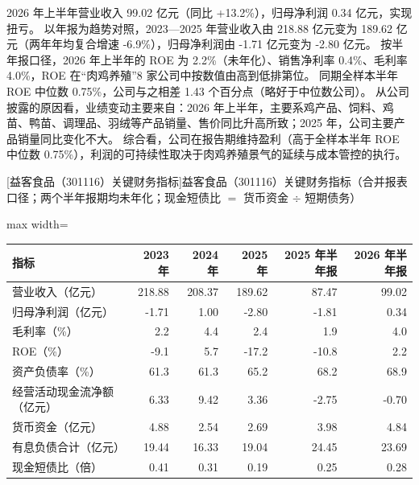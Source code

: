  2026 年上半年营业收入 99.02 亿元（同比 +13.2\%），归母净利润 0.34 亿元，实现扭亏。 以年报为趋势对照，2023---2025 年营业收入由 218.88 亿元变为 189.62 亿元（两年年均复合增速 -6.9\%），归母净利润由 -1.71 亿元变为 -2.80 亿元。 按半年报口径，2026 年上半年的 ROE 为 2.2\%（未年化）、销售净利率 0.4\%、毛利率 4.0\%，ROE 在“肉鸡养殖”8 家公司中按数值由高到低排第位。 同期全样本半年 ROE 中位数 0.75\%，公司与之相差 1.43 个百分点（略好于中位数公司）。 从公司披露的原因看，业绩变动主要来自：2026 年上半年，主要系鸡产品、饲料、鸡苗、鸭苗、调理品、羽绒等产品销量、售价同比升高所致；2025 年，公司主要产品销量同比变化不大。 综合看，公司在报告期维持盈利（高于全样本半年 ROE 中位数 0.75\%），利润的可持续性取决于肉鸡养殖景气的延续与成本管控的执行。

\begin{center}\small\setlength{\tabcolsep}{3.4pt}
[益客食品（301116）关键财务指标]{益客食品（301116）关键财务指标（合并报表口径；两个半年报期均未年化；现金短债比 $=$ 货币资金 $\div$ 短期债务）}
\begin{adjustbox}{max width=\textwidth}
\begin{tabular}{@{}lrrrrr@{}}
\toprule
指标 & 2023 年 & 2024 年 & 2025 年 & 2025 年半年报 & 2026 年半年报 \\
\midrule
营业收入（亿元） & 218.88 & 208.37 & 189.62 & 87.47 & 99.02 \\
归母净利润（亿元） & -1.71 & 1.00 & -2.80 & -1.81 & 0.34 \\
毛利率（\%） & 2.2 & 4.4 & 2.4 & 1.9 & 4.0 \\
ROE（\%） & -9.1 & 5.7 & -17.2 & -10.8 & 2.2 \\
资产负债率（\%） & 61.3 & 61.3 & 65.2 & 68.2 & 68.9 \\
经营活动现金流净额（亿元） & 6.33 & 9.42 & 3.36 & -2.75 & -0.70 \\
货币资金（亿元） & 4.88 & 2.54 & 2.69 & 3.98 & 4.84 \\
有息负债合计（亿元） & 19.44 & 16.33 & 19.04 & 24.45 & 23.69 \\
现金短债比（倍） & 0.41 & 0.31 & 0.19 & 0.25 & 0.28 \\
\bottomrule
\end{tabular}
\end{adjustbox}
\end{center}

